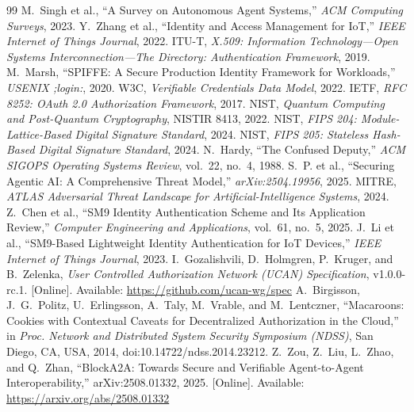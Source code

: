 \documentclass[10pt,twocolumn]{IEEEtran}
\begin{document}
\begin{appendices}
\begin{thebibliography}{99}
   M.~Singh et al., ``A Survey on Autonomous Agent Systems,''
    \emph{ACM Computing Surveys}, 2023.
   Y.~Zhang et al., ``Identity and Access Management for IoT,''
    \emph{IEEE Internet of Things Journal}, 2022.
   ITU-T, \emph{X.509: Information Technology---Open Systems Interconnection---The Directory:
    Authentication Framework}, 2019.
   M.~Marsh, ``SPIFFE: A Secure Production Identity Framework for Workloads,''
    \emph{USENIX ;login:}, 2020.
   W3C, \emph{Verifiable Credentials Data Model}, 2022.
   IETF, \emph{RFC 8252: OAuth 2.0 Authorization Framework}, 2017.
   NIST, \emph{Quantum Computing and Post-Quantum Cryptography},
    NISTIR 8413, 2022.
   NIST, \emph{FIPS 204: Module-Lattice-Based Digital Signature Standard}, 2024.
   NIST, \emph{FIPS 205: Stateless Hash-Based Digital Signature Standard}, 2024.
   N.~Hardy, ``The Confused Deputy,''
    \emph{ACM SIGOPS Operating Systems Review}, vol.~22, no.~4, 1988.
   S.~P. et al., ``Securing Agentic AI: A Comprehensive
    Threat Model,'' \emph{arXiv:2504.19956}, 2025.
   MITRE, \emph{ATLAS Adversarial Threat Landscape for
    Artificial-Intelligence Systems}, 2024.
   Z.~Chen et al., ``SM9 Identity Authentication Scheme and Its
    Application Review,'' \emph{Computer Engineering and Applications}, vol.~61, no.~5,
    2025.
   J.~Li et al., ``SM9-Based Lightweight Identity Authentication
    for IoT Devices,'' \emph{IEEE Internet of Things Journal}, 2023.
   I.~Gozalishvili, D.~Holmgren, P.~Kruger, and B.~Zelenka,
    \emph{User Controlled Authorization Network (UCAN) Specification}, v1.0.0-rc.1.
    [Online]. Available: \url{https://github.com/ucan-wg/spec}
   A.~Birgisson, J.~G.~Politz, U.~Erlingsson, A.~Taly,
    M.~Vrable, and M.~Lentczner, ``Macaroons: Cookies with Contextual Caveats
    for Decentralized Authorization in the Cloud,'' in \emph{Proc. Network and
    Distributed System Security Symposium (NDSS)}, San Diego, CA, USA, 2014,
    doi:10.14722/ndss.2014.23212.
   Z.~Zou, Z.~Liu, L.~Zhao, and Q.~Zhan, ``BlockA2A: Towards
    Secure and Verifiable Agent-to-Agent Interoperability,'' arXiv:2508.01332, 2025.
    [Online]. Available: \url{https://arxiv.org/abs/2508.01332}

\end{thebibliography}
\end{appendices}
\end{document}
